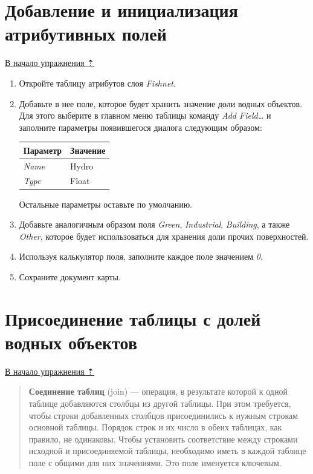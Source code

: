 \documentclass[12pt,]{book}
\begin{document}
\hypertarget{land-cover-hydro-fields}{%
\section{Добавление и инициализация атрибутивных полей}\label{land-cover-hydro-fields}}

\protect\hyperlink{land-cover-hydro}{В начало упражнения ⇡}

\begin{enumerate}
\def\labelenumi{\arabic{enumi}.}
\item
  Откройте таблицу атрибутов слоя \emph{Fishnet}.
\item
  Добавьте в нее поле, которое будет хранить значение доли водных объектов. Для этого выберите в главном меню таблицы команду \emph{Add Field\ldots{}} и заполните параметры появившегося диалога следующим образом:

  \begin{longtable}[]{@{}ll@{}}
  \toprule
  Параметр & Значение\tabularnewline
  \midrule
  \endhead
  \emph{Name} & Hydro\tabularnewline
  \emph{Type} & Float\tabularnewline
  \bottomrule
  \end{longtable}

  Остальные параметры оставьте по умолчанию.
\item
  Добавьте аналогичным образом поля \emph{Green}, \emph{Industrial}, \emph{Building}, а также \emph{Other}, которое будет использоваться для хранения доли прочих поверхностей.
\item
  Используя калькулятор поля, заполните каждое поле значением \emph{0}.
\item
  Сохраните документ карты.
\end{enumerate}

\hypertarget{land-cover-hydro-water-tables}{%
\section{Присоединение таблицы с долей водных объектов}\label{land-cover-hydro-water-tables}}

\protect\hyperlink{land-cover-hydro}{В начало упражнения ⇡}

\begin{quote}
\textbf{Соединение таблиц} (join) --- операция, в результате которой к одной таблице добавляются столбцы из другой таблицы. При этом требуется, чтобы строки добавленных столбцов присоединились к нужным строкам основной таблицы. Порядок строк и их число в обеих таблицах, как правило, не одинаковы. Чтобы установить соответствие между строками исходной и присоединяемой таблицы, необходимо иметь в каждой таблице поле с общими для них значениями. Это поле именуется ключевым.
\end{quote}
\end{document}
